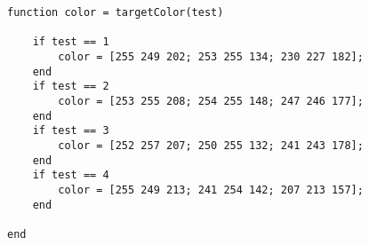 \begin{verbatim}
function color = targetColor(test)

    if test == 1
        color = [255 249 202; 253 255 134; 230 227 182];		
    end
    if test == 2
        color = [253 255 208; 254 255 148; 247 246 177];		
    end
    if test == 3
        color = [252 257 207; 250 255 132; 241 243 178];		
    end
    if test == 4
        color = [255 249 213; 241 254 142; 207 213 157];		
    end

end
\end{verbatim}